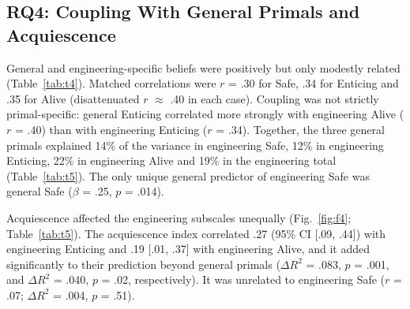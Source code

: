 \documentclass[journal,a4paper]{IEEEtran}
\begin{document}
\subsection{RQ4: Coupling With General Primals and Acquiescence}

General and engineering-specific beliefs were positively but only modestly related (Table~\ref{tab:t4}). Matched correlations were $r$ = .30 for Safe, .34 for Enticing and .35 for Alive (disattenuated $r$ $\approx$ .40 in each case). Coupling was not strictly primal-specific: general Enticing correlated more strongly with engineering Alive ($r$ = .40) than with engineering Enticing ($r$ = .34). Together, the three general primals explained 14\% of the variance in engineering Safe, 12\% in engineering Enticing, 22\% in engineering Alive and 19\% in the engineering total (Table~\ref{tab:t5}). The only unique general predictor of engineering Safe was general Safe ($\beta$ = .25, $p$ = .014).

Acquiescence affected the engineering subscales unequally (Fig.~\ref{fig:f4}; Table~\ref{tab:t5}). The acquiescence index correlated .27 (95\% CI [.09, .44]) with engineering Enticing and .19 [.01, .37] with engineering Alive, and it added significantly to their prediction beyond general primals ($\Delta R ^2$ = .083, $p$ = .001, and $\Delta R ^2$ = .040, $p$ = .02, respectively). It was unrelated to engineering Safe ($r$ = .07; $\Delta R ^2$ = .004, $p$ = .51).
\end{document}
